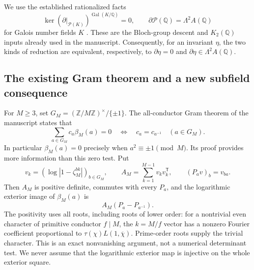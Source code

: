 \documentclass[11pt,a4paper]{article}
\theoremstyle{definition}
\theoremstyle{remark}
\numberwithin{equation}{section}
\begin{document}
We use the established rationalized facts
\[
 \ker(\partial|_{\mathcal P(K)})^{\operatorname{Gal}(K/\mathbb Q)}=0,
 \qquad
 \partial\mathcal P(\mathbb Q)=\Lambda^2 A(\mathbb Q)
\]
for Galois number fields $K$ \cite[\texttt{hstruct:eq:bloch-facts}]{ProveItSnapshot}. These are the Bloch-group descent and
$K_2(\mathbb Q)$ inputs already used in the manuscript. Consequently,
for an invariant $\eta$, the two kinds of reduction are equivalent,
respectively, to $\partial\eta=0$ and
$\partial\eta\in\Lambda^2 A(\mathbb Q)$.

\subsection{The existing Gram theorem and a new subfield consequence}

For $M\ge3$, set $G_M=(\mathbb Z/M\mathbb Z)^\times/\{\pm1\}$.
The all-conductor Gram theorem of the manuscript
\cite[\texttt{hstruct:thm:kernel}, \texttt{hstruct:lem:positive-Gram}]{ProveItSnapshot}
states that
\begin{equation}\label{jnew:eq:kernel}
 \sum_{a\in G_M}c_a\beta_M(a)=0
 \quad\Longleftrightarrow\quad c_a=c_{a^{-1}}\quad(a\in G_M).
\end{equation}
In particular $\beta_M(a)=0$ precisely when $a^2\equiv\pm1\pmod M$.
Its proof provides more information than this zero test. Put
\[
 v_k=(\log|1-\zeta_M^{bk}|)_{b\in G_M},\qquad
 A_M=\sum_{k=1}^{M-1}v_kv_k^{\mathsf T},\qquad
 (P_av)_b=v_{ba}.
\]
Then $A_M$ is positive definite, commutes with every $P_a$, and the
logarithmic exterior image of $\beta_M(a)$ is
\begin{equation}\label{jnew:eq:Gram-image}
 A_M(P_a-P_{a^{-1}}).
\end{equation}
The positivity uses all roots, including roots of lower order: for a
nontrivial even character of primitive conductor $f\mid M$, the
$k=M/f$ vector has a nonzero Fourier coefficient proportional to
$\tau(\chi)L(1,\overline\chi)$. Prime-order roots supply the trivial
character. This is an exact nonvanishing argument, not a numerical
determinant test. We never assume that the logarithmic exterior map
is injective on the whole exterior square.
\end{document}
